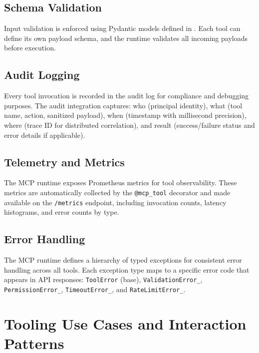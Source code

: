 \documentclass[a4paper,twoside]{sapthesis}
\begin{document}
\subsection{Schema Validation}
\label{subsec:schema-validation}

Input validation is enforced using Pydantic models defined in . Each tool can define its own payload schema, and the runtime validates all incoming payloads before execution.

\subsection{Audit Logging}
\label{subsec:mcp-audit-logging}

Every tool invocation is recorded in the audit log for compliance and debugging purposes. The audit integration captures: who (principal identity), what (tool name, action, sanitized payload), when (timestamp with millisecond precision), where (trace ID for distributed correlation), and result (success/failure status and error details if applicable).

\subsection{Telemetry and Metrics}
\label{subsec:mcp-telemetry}

The MCP runtime exposes Prometheus metrics for tool observability. These metrics are automatically collected by the \texttt{@mcp\_tool} decorator and made available on the \texttt{/metrics} endpoint, including invocation counts, latency histograms, and error counts by type.

\subsection{Error Handling}
\label{subsec:mcp-error-handling}

The MCP runtime defines a hierarchy of typed exceptions for consistent error handling across all tools. Each exception type maps to a specific error code that appears in API responses: \texttt{ToolError} (base), \texttt{ValidationError\_}, \texttt{PermissionError\_}, \texttt{TimeoutError\_}, and \texttt{RateLimitError\_}.

\section{Tooling Use Cases and Interaction Patterns}
\label{sec:tooling-use-cases}
\end{document}
